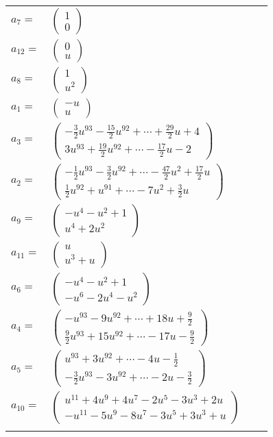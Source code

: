 \documentclass[1p]{elsarticle_modified}
\theoremstyle{definition}
\begin{document}
\begin{tabular}{m{7pt} m{180pt} m{7pt} m{180pt} }
\flushright $a_{7}=$&$\begin{pmatrix}1\\0\end{pmatrix}$ \\
\flushright $a_{12}=$&$\begin{pmatrix}0\\u\end{pmatrix}$ \\
\flushright $a_{8}=$&$\begin{pmatrix}1\\u^2\end{pmatrix}$ \\
\flushright $a_{1}=$&$\begin{pmatrix}- u\\u\end{pmatrix}$ \\
\flushright $a_{3}=$&$\begin{pmatrix}-\frac{3}{2} u^{93}-\frac{15}{2} u^{92}+\cdots+\frac{29}{2} u+4\\3 u^{93}+\frac{19}{2} u^{92}+\cdots-\frac{17}{2} u-2\end{pmatrix}$ \\
\flushright $a_{2}=$&$\begin{pmatrix}-\frac{1}{2} u^{93}-\frac{3}{2} u^{92}+\cdots-\frac{47}{2} u^2+\frac{17}{2} u\\\frac{1}{2} u^{92}+u^{91}+\cdots-7 u^2+\frac{3}{2} u\end{pmatrix}$ \\
\flushright $a_{9}=$&$\begin{pmatrix}- u^4- u^2+1\\u^4+2 u^2\end{pmatrix}$ \\
\flushright $a_{11}=$&$\begin{pmatrix}u\\u^3+u\end{pmatrix}$ \\
\flushright $a_{6}=$&$\begin{pmatrix}- u^4- u^2+1\\- u^6-2 u^4- u^2\end{pmatrix}$ \\
\flushright $a_{4}=$&$\begin{pmatrix}- u^{93}-9 u^{92}+\cdots+18 u+\frac{9}{2}\\\frac{9}{2} u^{93}+15 u^{92}+\cdots-17 u-\frac{9}{2}\end{pmatrix}$ \\
\flushright $a_{5}=$&$\begin{pmatrix}u^{93}+3 u^{92}+\cdots-4 u-\frac{1}{2}\\-\frac{3}{2} u^{93}-3 u^{92}+\cdots-2 u-\frac{3}{2}\end{pmatrix}$ \\
\flushright $a_{10}=$&$\begin{pmatrix}u^{11}+4 u^9+4 u^7-2 u^5-3 u^3+2 u\\- u^{11}-5 u^9-8 u^7-3 u^5+3 u^3+u\end{pmatrix}$\\&\end{tabular}
\end{document}
